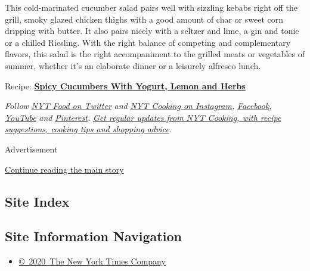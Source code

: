 This cold-marinated cucumber salad pairs well with sizzling kebabs right
off the grill, smoky glazed chicken thighs with a good amount of char or
sweet corn dripping with butter. It also pairs nicely with a seltzer and
lime, a gin and tonic or a chilled Riesling. With the right balance of
competing and complementary flavors, this salad is the right
accompaniment to the grilled meats or vegetables of summer, whether it's
an elaborate dinner or a leisurely alfresco lunch.

Recipe:
\textbf{\href{https://cooking.nytimes.com/recipes/1021278-spicy-cucumbers-with-yogurt-lemon-and-herbs}{Spicy
Cucumbers With Yogurt, Lemon and Herbs}}

\emph{Follow} \href{https://twitter.com/nytfood}{\emph{NYT Food on
Twitter}} \emph{and}
\href{https://www.instagram.com/nytcooking/}{\emph{NYT Cooking on
Instagram}}\emph{,}
\href{https://www.facebook.com/nytcooking/}{\emph{Facebook}}\emph{,}
\href{https://www.youtube.com/nytcooking}{\emph{YouTube}} \emph{and}
\href{https://www.pinterest.com/nytcooking/}{\emph{Pinterest}}\emph{.}
\href{https://www.nytimes.com/newsletters/cooking}{\emph{Get regular
updates from NYT Cooking, with recipe suggestions, cooking tips and
shopping advice}}\emph{.}

Advertisement

\protect\hyperlink{after-bottom}{Continue reading the main story}

\hypertarget{site-index}{%
\subsection{Site Index}\label{site-index}}

\hypertarget{site-information-navigation}{%
\subsection{Site Information
Navigation}\label{site-information-navigation}}

\begin{itemize}
\tightlist
\item
  \href{https://help.nytimes.com/hc/en-us/articles/115014792127-Copyright-notice}{©~2020~The
  New York Times Company}
\end{itemize}

